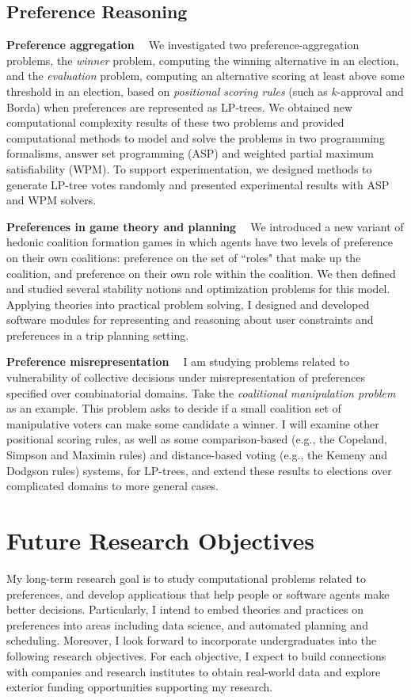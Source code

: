 \documentclass[11pt]{article}
\begin{document}
\subsection{Preference Reasoning}
\smallskip \noindent \textbf{Preference aggregation  \ }
We investigated two preference-aggregation 
problems, the \emph{winner} problem, computing the winning alternative in an election,
and the \emph{evaluation} problem, computing an alternative scoring at least above
some threshold in an election,
based on \textit{positional scoring rules} (such as $k$-approval and Borda) 
when preferences are represented as LP-trees\cite{LiuT:LPT_ASP}. 
We obtained new computational complexity results of these two problems and
provided computational methods to model and solve the problems in two programming formalisms, 
answer set programming (ASP) and weighted partial maximum satisfiability (WPM).
To support experimentation, we designed methods
to generate LP-tree votes randomly and presented experimental results
with ASP and WPM solvers.

\smallskip \noindent \textbf{Preferences in game theory and planning  \ }
We introduced a new variant of hedonic coalition formation
games in which agents have two levels of preference on their own coalitions:
preference on the set of ``roles" that make up the coalition, and
preference on their own role within the coalition\cite{Spradling}. 
We then defined and studied several stability
notions and optimization problems for this model.
Applying theories into practical problem solving, I designed and developed software modules
for representing and reasoning about user constraints and preferences in a trip planning
setting.

\smallskip \noindent \textbf{Preference misrepresentation  \ }
I am studying problems related to vulnerability of collective decisions under misrepresentation of preferences
specified over combinatorial domains.
Take the \textit{coalitional manipulation problem} as an example.
This problem asks to decide if a small coalition set of manipulative
voters can make some candidate a winner.
I will examine other positional scoring rules, as well as
some comparison-based (e.g., the Copeland, Simpson and Maximin rules) and 
distance-based voting (e.g., the Kemeny and Dodgson rules) systems, for LP-trees,
and extend these results to elections over complicated domains to more general cases.

\section{Future Research Objectives}
\noindent My long-term research goal is to study computational problems related to preferences, and 
develop applications that help people or software agents make better decisions.
Particularly, I intend to embed theories and practices on preferences into areas including
data science, and automated planning and scheduling.
Moreover, I look forward to incorporate undergraduates into the following research objectives.
For each objective, I expect to build connections with companies and research institutes
to obtain real-world data and explore exterior funding opportunities supporting my research.
\end{document}
